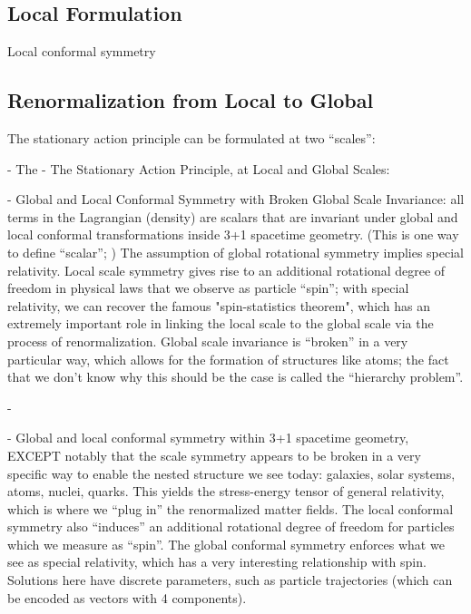 \subsection{Local Formulation}

Local conformal symmetry 

\subsection{Renormalization from Local to Global}

The stationary action principle can be formulated at two ``scales'':

- The
  - The Stationary Action Principle, at Local and Global Scales: 

  - Global and Local Conformal Symmetry with Broken Global Scale Invariance: all terms in the Lagrangian (density) are scalars that are invariant under global and local conformal transformations inside 3+1 spacetime geometry. (This is one way to define ``scalar''; ) The assumption of global rotational symmetry implies special relativity. Local scale symmetry gives rise to an additional rotational degree of freedom in physical laws that we observe as particle ``spin''; with special relativity, we can recover the famous "spin-statistics theorem", which has an extremely important role in linking the local scale to the global scale via the process of renormalization. Global scale invariance is ``broken'' in a very particular way, which allows for the formation of structures like atoms; the fact that we don't know why this should be the case is called the ``hierarchy problem''.
  
  - 

  - Global and local conformal symmetry within 3+1 spacetime geometry, EXCEPT notably that the scale symmetry appears to be broken in a very specific way to enable the nested structure we see today: galaxies, solar systems, atoms, nuclei, quarks. This yields the stress-energy tensor of general relativity, which is where we ``plug in'' the renormalized matter fields. The local conformal symmetry also ``induces'' an additional rotational degree of freedom for particles which we measure as ``spin''. The global conformal symmetry enforces what we see as special relativity, which has a very interesting relationship with spin. Solutions here have discrete parameters, such as particle trajectories (which can be encoded as vectors with 4 components).

